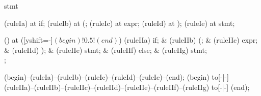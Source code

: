 \begin{syntax}{stmt}
  
  \node[terminal]    (ruleIa)  at  {if};
  \node[terminal]    (ruleIb)  at  {(};
  \node[nonterminal] (ruleIc)  at  {expr};
  \node[terminal]    (ruleId)  at  {)};
  \node[nonterminal] (ruleIe)  at  {stmt};
  
  \node[sequence] () at ([yshift=-\syntaxruledist]$(begin)!0.5!(end)$) {
    \node[terminal]    (ruleIIa) {if};
    &
    \node[terminal]    (ruleIIb) {(};
    &
    \node[nonterminal] (ruleIIc) {expr};
    &
    \node[terminal]    (ruleIId) {)};
    &
    \node[nonterminal] (ruleIIe) {stmt};
    &
    \node[terminal]    (ruleIIf) {else};
    &
    \node[nonterminal] (ruleIIg) {stmt};
    \\
  };
  
  \draw[path] (begin)--(ruleIa)--(ruleIb)--(ruleIc)--(ruleId)--(ruleIe)--(end);
  \draw[path] (begin) to[-|-] (ruleIIa)--(ruleIIb)--(ruleIIc)--(ruleIId)--(ruleIIe)--(ruleIIf)--(ruleIIg) to[-|-] (end);
\end{syntax}
